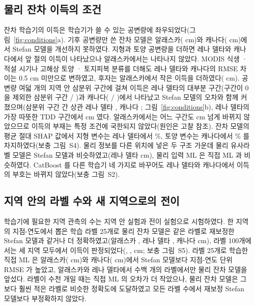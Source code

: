 \subsection{물리 잔차 이득의 조건}
잔차 학습기의 이득은 학습기가 쓸 수 있는 공변량에 좌우되었다(그림~\ref{fig:conditions}a). 기후 공변량만 쓴 잔차 모델은 알래스카(\ndfeatAkFclim{} cm)와 캐나다(\ndfeatCaFclim{} cm)에서 Stefan 모델을 개선하지 못하였다. 지형과 토양 공변량을 더하면 레나 델타와 캐나다에서 앞 절의 이득이 나타났으나 알래스카에서는 나타나지 않았다. MODIS 식생 · 적설 시기나 고해상 토양 · 토지피복 분류를 더해도 레나 델타와 캐나다의 RMSE 차이는 0.5 cm 미만으로 변하였고, 후자는 알래스카에서 작은 이득을 더하였다(\ndfeatAkFhires{} cm). 공변량 여덟 개의 지역 안 삼분위 구간에 걸쳐 이득은 레나 델타의 대부분 구간(구간이 0 을 제외한 삼분위 구간 \ngcLesig{} / \ngcLecells{})과 캐나다(\ngcCasig{} / \ngcCacells)에서 나타났고 Stefan 모델의 오차와 함께 커졌으며(삼분위 구간 간 상관 레나 델타 \ngcLecorr, 캐나다 \ngcCacorr; 그림~\ref{fig:conditions}b), 레나 델타의 가장 따뜻한 TDD 구간에서 \ndtddLewarm{} cm 였다. 알래스카에서는 어느 구간도 \ngcAkmaxabs{} cm 넘게 바뀌지 않았으므로 이득의 부재는 특정 조건에 국한되지 않았다(원인은 고찰 참조). 잔차 모델의 평균 절대 SHAP 값에서 지형 변수는 레나 델타에서 \nshapLeResTerrain\%, 토양 변수는 캐나다에서 \nshapCaResSoil\% 를 차지하였다(보충 그림~S4). 물리 정보를 다른 위치에 넣은 두 구조 가운데 물리 유사라벨 모델은 Stefan 모델과 비슷하였고(레나 델타 \ndrefLeblkDo{} cm), 물리 입력 ML 은 직접 ML 과 비슷하였다. CatBoost 를 다른 학습기 네 가지로 바꾸어도 레나 델타와 캐나다에서 이득의 부호는 바뀌지 않았다(보충 그림~S2).


\subsection{지역 안의 라벨 수와 새 지역으로의 전이}
학습기에 필요한 지역 관측의 수는 지역 안 실험과 전이 실험으로 시험하였다. 한 지역의 지점-연도에서 뽑은 학습 라벨 25개로 물리 잔차 모델은 같은 라벨로 재보정한 Stefan 모델과 같거나 더 정확하였고(알래스카 \nllAkRotwfive, 레나 델타 \nllLeRotwfive, 캐나다 \nllCaRotwfive{} cm), 라벨 100개에서는 세 지역 모두에서 이득이 판정되었다(\nllAkRohundred, \nllLeRohundred, \nllCaRohundred{} cm; 보충 그림~S5). 라벨 25개로 학습한 직접 ML 은 알래스카(\nllAkDztwfive{} cm)와 캐나다(\nllCaDztwfive{} cm)에서 Stefan 모델보다 지점-연도 단위 RMSE 가 높았고, 알래스카와 레나 델타에서 수백 개의 라벨에서만 물리 잔차 모델을 앞섰다. 라벨이 수천 개일 때는 직접 ML 의 오차가 더 작았으나, 물리 잔차 모델은 그보다 훨씬 적은 라벨로 비슷한 정확도에 도달하였고 모든 라벨 수에서 재보정 Stefan 모델보다 부정확하지 않았다.

